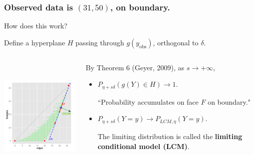 \documentclass[ 10pt]{beamer}
\newcommand{\yobs}{y_{\text{obs}}}
\begin{document}
\frame
{
	\frametitle{Observed data is $(31,50)$, on boundary.}
How does this work?
\vspace{2mm}

Define a hyperplane $H$ passing through $g(\yobs)$, orthogonal to $\delta$.
\begin{columns}[]
\begin{column}[T]{0.43\textwidth}
\includegraphics[height=2.2in]{g9-H.png}
\end{column}
\begin{column}[t]{0.57\textwidth}

\pause
By Theorem 6 (Geyer, 2009), as $s \to +\infty$,
\vspace{1mm}
\begin{itemize}
\item $P_{\eta + s \delta}( g(Y) \in H) \to 1.$
\vspace{1mm}

``Probability accumulates on face $F$ on boundary."
\vspace{3mm}

\pause
\item $P_{\eta + s \delta}( Y = y) \to P_{LCM, \eta}( Y = y)$.
\vspace{1mm}

The limiting distribution is called the \textbf{limiting conditional model (LCM)}.
\end{itemize}
\end{column}
\end{columns}
}
\end{document}
